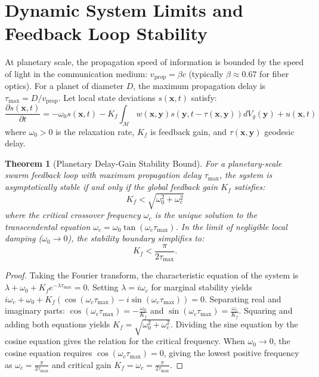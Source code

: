 \documentclass[11pt,oneside]{book}
\theoremstyle{definition}
\theoremstyle{plain}
\newtheorem{theorem}{Theorem}[chapter]
\theoremstyle{remark}
\begin{document}
\section{Dynamic System Limits and Feedback Loop Stability}
At planetary scale, the propagation speed of information is bounded by the speed of light in the communication medium: $v_{\mathrm{prop}} = \beta c$ (typically $\beta \approx 0.67$ for fiber optics). %
For a planet of diameter $D$, the maximum propagation delay is $\tau_{\mathrm{max}} = D / v_{\mathrm{prop}}$. %
Let local state deviations $s(\mathbf{x}, t)$ satisfy:
\[
\frac{\partial s(\mathbf{x}, t)}{\partial t} = -\omega_0 s(\mathbf{x}, t) - K_f \int_{\mathcal{M}} w(\mathbf{x}, \mathbf{y}) s\left(\mathbf{y}, t - \tau(\mathbf{x}, \mathbf{y})\right) dV_g(\mathbf{y}) + u(\mathbf{x}, t)
\]
where $\omega_0 > 0$ is the relaxation rate, $K_f$ is feedback gain, and $\tau(\mathbf{x}, \mathbf{y})$ geodesic delay. %

\begin{theorem}[Planetary Delay-Gain Stability Bound]\label{thm:stability_bound}
For a planetary-scale swarm feedback loop with maximum propagation delay $\tau_{\mathrm{max}}$, the system is asymptotically stable if and only if the global feedback gain $K_f$ satisfies:
\[
K_f < \sqrt{\omega_0^2 + \omega_c^2}
\]
where the critical crossover frequency $\omega_c$ is the unique solution to the transcendental equation $\omega_c = \omega_0 \tan(\omega_c \tau_{\mathrm{max}})$. %
In the limit of negligible local damping ($\omega_0 \to 0$), the stability boundary simplifies to:
\[
K_f < \frac{\pi}{2 \tau_{\mathrm{max}}}.
\]
\end{theorem}

\begin{proof}
Taking the Fourier transform, the characteristic equation of the system is $\lambda + \omega_0 + K_f e^{-\lambda \tau_{\mathrm{max}}} = 0$. %
Setting $\lambda = i \omega_c$ for marginal stability yields $i \omega_c + \omega_0 + K_f \left( \cos(\omega_c \tau_{\mathrm{max}}) - i \sin(\omega_c \tau_{\mathrm{max}}) \right) = 0$. %
Separating real and imaginary parts: $\cos(\omega_c \tau_{\mathrm{max}}) = -\frac{\omega_0}{K_f}$ and $\sin(\omega_c \tau_{\mathrm{max}}) = \frac{\omega_c}{K_f}$. %
Squaring and adding both equations yields $K_f = \sqrt{\omega_0^2 + \omega_c^2}$. %
Dividing the sine equation by the cosine equation gives the relation for the critical frequency. %
When $\omega_0 \to 0$, the cosine equation requires $\cos(\omega_c \tau_{\mathrm{max}}) = 0$, giving the lowest positive frequency as $\omega_c = \frac{\pi}{2 \tau_{\mathrm{max}}}$ and critical gain $K_f = \omega_c = \frac{\pi}{2 \tau_{\mathrm{max}}}$. %
\end{proof}
\end{document}
